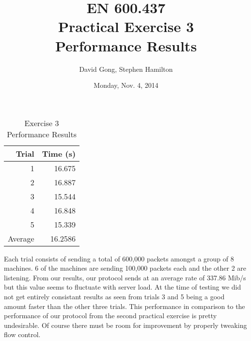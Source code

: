 \documentclass[11pt]{article}
\title{EN 600.437\\Practical Exercise 3\\Performance Results}
\author{David Gong, Stephen Hamilton}
\date{Monday, Nov. 4, 2014}
\begin{document}
\maketitle
\begin{table}[h]
\begin{center}
\begin{tabular}{|r|r|}\hline
Trial & Time (s)\\\hline
1 & 16.675\\\hline
2 & 16.887\\\hline
3 & 15.544\\\hline
4 & 16.848\\\hline
5 & 15.339\\\hline
Average & 16.2586\\\hline
\end{tabular}
\caption{Exercise 3 Performance Results}
\end{center}
\end{table}
Each trial consists of sending a total of 600,000 packets amongst a group of 8 machines. 6 of the machines are sending 100,000 packets each and the other 2 are listening. From our results, our protocol sends at an average rate of 337.86 Mib/s but this value seems to fluctuate with server load. At the time of testing we did not get entirely consistant results as seen from trials 3 and 5 being a good amount faster than the other three trials. This performance in comparison to the performance of our protocol from the second practical exercise is pretty undesirable. Of course there must be room for improvement by properly tweaking flow control.
\end{document}
